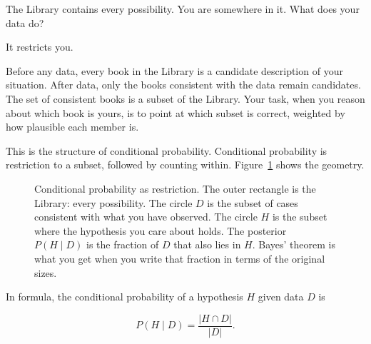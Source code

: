 The Library contains every possibility. You are somewhere in it. What does your data do?

It restricts you.

Before any data, every book in the Library is a candidate description of your situation. After data, only the books consistent with the data remain candidates. The set of consistent books is a subset of the Library. Your task, when you reason about which book is yours, is to point at which subset is correct, weighted by how plausible each member is.

This is the structure of conditional probability. Conditional probability is restriction to a subset, followed by counting within. Figure~\ref{fig:bayes-counting} shows the geometry.

\begin{figure}[h]
\centering
{}
\caption{Conditional probability as restriction. The outer rectangle is the Library: every possibility. The circle $D$ is the subset of cases consistent with what you have observed. The circle $H$ is the subset where the hypothesis you care about holds. The posterior $P(H \mid D)$ is the fraction of $D$ that also lies in $H$. Bayes' theorem is what you get when you write that fraction in terms of the original sizes.}
\label{fig:bayes-counting}
\end{figure}

In formula, the conditional probability of a hypothesis $H$ given data $D$ is

$$P(H \mid D) = \frac{|H \cap D|}{|D|}.$$

